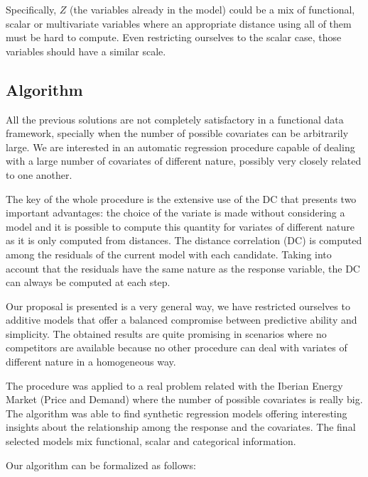 \documentclass[
]{book}
\begin{document}
Specifically, \(Z\) (the variables already in the model) could be a mix of functional, scalar or multivariate variables where an appropriate distance using all of them must be hard to compute. Even restricting ourselves to the scalar case, those variables should have a similar scale.

\hypertarget{algorithm}{%
\subsection{Algorithm}\label{algorithm}}

All the previous solutions are not completely satisfactory in a functional data framework, specially when the number of possible covariates can be arbitrarily large. We are interested in an automatic regression procedure capable of dealing with a large number of covariates of different nature, possibly very closely related to one another.

The key of the whole procedure is the extensive use of the DC that presents two important advantages: the choice of the variate is made without considering a model and it is possible to compute this quantity for variates of different nature as it is only computed from distances. The distance correlation (DC) is computed among the residuals of the current model with each candidate. Taking into account that the residuals have the same nature as the response variable, the DC can always be computed at each step.

Our proposal is presented is a very general way, we have restricted ourselves to additive models that offer a balanced compromise between predictive ability and simplicity. The obtained results are quite promising in scenarios where no competitors are available because no other procedure can deal with variates of different nature in a homogeneous way.

The procedure was applied to a real problem related with the Iberian Energy Market (Price and Demand) where the number of possible covariates is really big. The algorithm was able to find synthetic regression models offering interesting insights about the relationship among the response and the covariates. The final selected models mix functional, scalar and categorical information.

Our algorithm can be formalized as follows:
\end{document}
